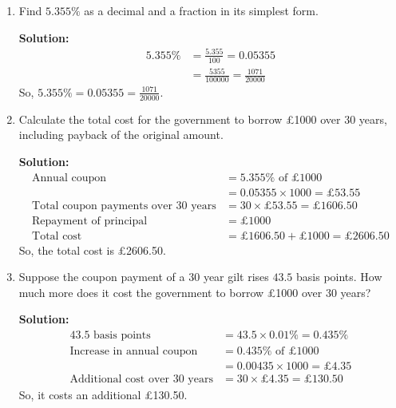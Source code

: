 \documentclass[12pt]{article}
\begin{document}
\begin{enumerate}[label=(\alph*), resume]
    \item Find \(5.355\%\) as a decimal and a fraction in its simplest form.
    
    \textbf{Solution:}
    \begin{align*}
        5.355\% &= \frac{5.355}{100} = 0.05355 \\
        &= \frac{5355}{100000} = \frac{1071}{20000}
    \end{align*}
    So, \(5.355\% = 0.05355 = \frac{1071}{20000}\).
    
    \item Calculate the total cost for the government to borrow £1000 over 30 years, including payback of the original amount.
    
    \textbf{Solution:}
    \begin{align*}
        \text{Annual coupon} &= 5.355\% \text{ of } £1000 \\
        &= 0.05355 \times 1000 = £53.55 \\
        \text{Total coupon payments over 30 years} &= 30 \times £53.55 = £1606.50 \\
        \text{Repayment of principal} &= £1000 \\
        \text{Total cost} &= £1606.50 + £1000 = £2606.50
    \end{align*}
    So, the total cost is £2606.50.
    
    \item Suppose the coupon payment of a 30 year gilt rises \(43.5\) basis points. How much more does it cost the government to borrow £1000 over 30 years?
    
    \textbf{Solution:}
    \begin{align*}
        43.5 \text{ basis points} &= 43.5 \times 0.01\% = 0.435\% \\
        \text{Increase in annual coupon} &= 0.435\% \text{ of } £1000 \\
        &= 0.00435 \times 1000 = £4.35 \\
        \text{Additional cost over 30 years} &= 30 \times £4.35 = £130.50
    \end{align*}
    So, it costs an additional £130.50.
\end{enumerate}
\end{document}
